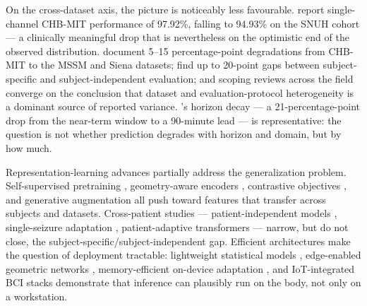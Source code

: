 On the cross-dataset axis, the picture is noticeably less favourable. \citet{JangEtAl2026} report single-channel CHB-MIT performance of 97.92\%, falling to 94.93\% on the SNUH cohort --- a clinically meaningful drop that is nevertheless on the optimistic end of the observed distribution. \citet{LiEtAl2025b} document 5--15 percentage-point degradations from CHB-MIT to the MSSM and Siena datasets; \citet{KoutsouvelisEtAl2024} find up to 20-point gaps between subject-specific and subject-independent evaluation; and scoping reviews across the field \cite{WuEtAl2025,TanEtAl2025,RenEtAl2022,WongEtAl2023,YimanWenqi2025} converge on the conclusion that dataset and evaluation-protocol heterogeneity is a dominant source of reported variance. \citet{AmiriEtAl2026}'s horizon decay --- a 21-percentage-point drop from the near-term window to a 90-minute lead --- is representative: the question is not whether prediction degrades with horizon and domain, but by how much.

Representation-learning advances partially address the generalization problem. Self-supervised pretraining \cite{BanvilleEtAl2020,JiangEtAl2024b}, geometry-aware encoders \cite{PaillardEtAl2025,ChenEtAl2026a}, contrastive objectives \cite{GuoEtAl2023,QiEtAl2025,LiaoEtAl2024}, and generative augmentation \cite{JiangEtAl2024a,XuEtAl2022,PuahEtAl2025,CinquettiEtAl2025} all push toward features that transfer across subjects and datasets. Cross-patient studies --- patient-independent models \cite{DissanayakeEtAl2020,JangEtAl2026}, single-seizure adaptation \cite{TariqEtAl2020,JadduEtAl2024}, patient-adaptive transformers \cite{MahdiBaghdadi2026} --- narrow, but do not close, the subject-specific/subject-independent gap. Efficient architectures make the question of deployment tractable: lightweight statistical models \cite{YangEtAl2025,WangEtAl2025b}, edge-enabled geometric networks \cite{AbbasiEtAl2025}, memory-efficient on-device adaptation \cite{LiEtAl2025a,XuYu2026}, and IoT-integrated BCI stacks \cite{Paneru2026,YedurkarEtAl2025,KumarEtAl2026,ThahniyathEtAl2024} demonstrate that inference can plausibly run on the body, not only on a workstation.

